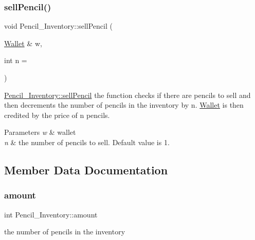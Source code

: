\subsubsection{\texorpdfstring{sell\+Pencil()}{sellPencil()}}
{\footnotesize\ttfamily void Pencil\+\_\+\+Inventory\+::sell\+Pencil (\begin{DoxyParamCaption}\item[{\hyperlink{classWallet}{Wallet} \&}]{w,  }\item[{int}]{n = {} }\end{DoxyParamCaption})}



\hyperlink{classPencil__Inventory_a1ed4fd3f13785ba2a93c9f4045a5cbc7}{Pencil\+\_\+\+Inventory\+::sell\+Pencil} the function checks if there are pencils to sell and then decrements the number of pencils in the inventory by n. \hyperlink{classWallet}{Wallet} is then credited by the price of n pencils. 


\begin{DoxyParams}{Parameters}
{\em w} & wallet \\
\hline
{\em n} & the number of pencils to sell. Default value is 1. \\
\hline
\end{DoxyParams}


\subsection{Member Data Documentation}
\mbox{\label{classPencil__Inventory_a19f4ff72e64dbd5c5fbb1fd302b54c85}} 
\subsubsection{\texorpdfstring{amount}{amount}}
{\footnotesize\ttfamily int Pencil\+\_\+\+Inventory\+::amount\hspace{0.3cm}{\ttfamily [private]}}



the number of pencils in the inventory 

\mbox{\label{classPencil__Inventory_a063e85195a84875c4b3f42c2f01ebdbd}} 
